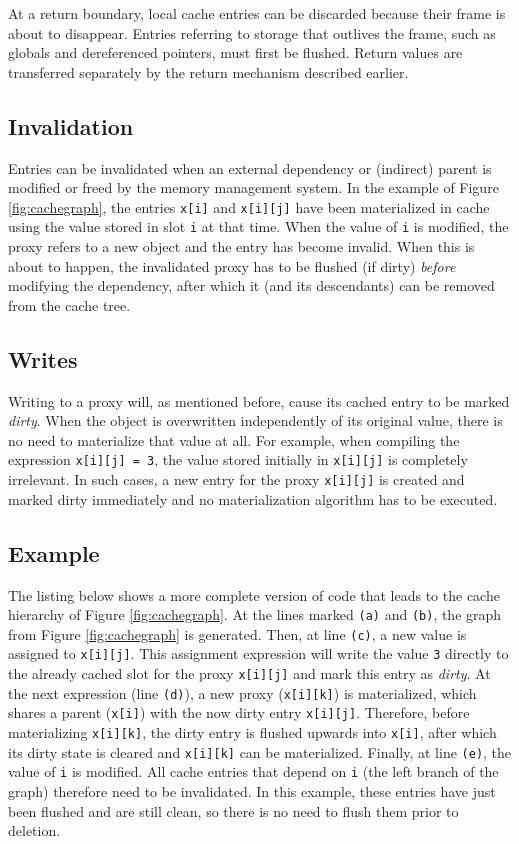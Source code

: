 At a return boundary, local cache entries can be discarded because their frame is about to disappear. Entries referring to storage that outlives the frame, such as globals and dereferenced pointers, must first be flushed. Return values are transferred separately by the return mechanism described earlier.

\subsection{Invalidation}\label{sec:compilation:invalidation}
Entries can be invalidated when an external dependency or (indirect) parent is modified or freed by the memory management system. In the example of Figure \ref{fig:cachegraph}, the entries \texttt{x[i]} and \texttt{x[i][j]} have been materialized in cache using the value stored in slot \texttt{i} at that time. When the value of \texttt{i} is modified, the proxy refers to a new object and the entry has become invalid. When this is about to happen, the invalidated proxy has to be flushed (if dirty) \emph{before} modifying the dependency, after which it (and its descendants) can be removed from the cache tree.

\subsection{Writes}
\label{sec:compilation:cachewrites}
Writing to a proxy will, as mentioned before, cause its cached entry to be marked \emph{dirty}. When the object is overwritten independently of its original value, there is no need to materialize that value at all. For example, when compiling the expression \texttt{x[i][j] = 3}, the value stored initially in \texttt{x[i][j]} is completely irrelevant. In such cases, a new entry for the proxy \texttt{x[i][j]} is created and marked dirty immediately and no materialization algorithm has to be executed.

\subsection{Example}\label{sec:compilation:cacheexample} The listing below shows a more complete version of code that leads to the cache hierarchy of Figure \ref{fig:cachegraph}. At the lines marked \texttt{(a)} and \texttt{(b)}, the graph from Figure \ref{fig:cachegraph} is generated. Then, at line \texttt{(c)}, a new value is assigned to \texttt{x[i][j]}. This assignment expression will write the value \texttt{3} directly to the already cached slot for the proxy \texttt{x[i][j]} and mark this entry as \emph{dirty}. At the next expression (line \texttt{(d)}), a new proxy (\texttt{x[i][k]}) is materialized, which shares a parent (\texttt{x[i]}) with the now dirty entry \texttt{x[i][j]}. Therefore, before materializing \texttt{x[i][k]}, the dirty entry is flushed upwards into \texttt{x[i]}, after which its dirty state is cleared and \texttt{x[i][k]} can be materialized. Finally, at line \texttt{(e)}, the value of \texttt{i} is modified. All cache entries that depend on \texttt{i} (the left branch of the graph) therefore need to be invalidated. In this example, these entries have just been flushed and are still clean, so there is no need to flush them prior to deletion.


